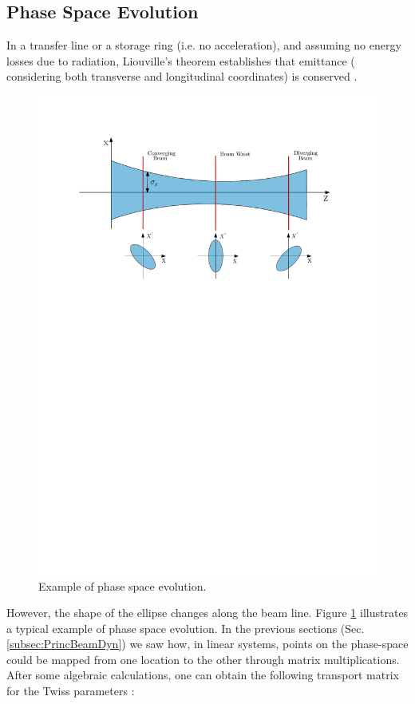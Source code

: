 \subsection{Phase Space Evolution}
\label{subsec:PhaseSpaceEvol}

In a transfer line or a storage ring (i.e. no acceleration), and assuming no energy losses due to radiation, Liouville's theorem establishes that emittance ( considering both transverse and longitudinal coordinates) is conserved \parencite*[][]{ref:EmittanceConserv}.

\begin{figure}[h]
    \centering
    \includegraphics[width=0.85\columnwidth]{Figure_BeamEvolution/BeamEvolution.pdf}
    \caption{Example of phase space evolution. }
    \label{fig:PhasSpaceEvol}
\end{figure}

However, the shape of the ellipse changes along the beam line. Figure \ref{fig:PhasSpaceEvol} illustrates a typical example of phase space evolution. 
In the previous sections (Sec. \ref{subsec:PrincBeamDyn}) we saw how, in linear systems, points on the phase-space could be mapped from one location to the other through matrix multiplications. After some algebraic calculations, one can obtain the following transport matrix for the Twiss parameters \parencite*[][]{ref:MatrixToTwiss}:

